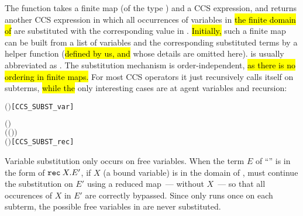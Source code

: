 The function  takes a finite
map  (of the type ) and a CCS expression,
and returns another CCS expression in which
all occurrences of variables in \hl{the finite domain of}  are substituted with
the corresponding value in . \hl{Initially,} such a finite map can be built from
a list of variables  and the corresponding substituted terms
 by a helper function  (\hl{defined by us, and} whose details are
omitted here).
 is usually
abbreviated as .
The substitution mechanism is order-independent, \hl{as there is no
ordering in finite maps.} For most CCS operators it
just recursively calls itself on subterms, \hl{while the} only
interesting cases are at agent variables and recursion:
\begin{alltt}
     \ensuremath{(} \ensuremath{)} \HOLTokenDefEquality{}   \HOLSymConst{\HOLTokenIn{}}         \hfill{[CCS_SUBST_var]}

     \ensuremath{(}  \ensuremath{)} \HOLTokenDefEquality{}
       \HOLSymConst{\HOLTokenIn{}}      \ensuremath{(} \ensuremath{(} \HOLSymConst{\ensuremath{\setminus}} \ensuremath{)} \ensuremath{)}
        \ensuremath{(}  \ensuremath{)}\hfill{[CCS_SUBST_rec]}
\end{alltt}
Variable substitution only occurs on free
variables. When the term $E$ of ``''
is in the form of ${\tt rec}\: X . E'$, if $X$ (a bound variable) is in
the domain of ,  must continue the
substitution on $E'$ using a reduced map~--- without $X$~--- so that all
occurences of $X$ in $E'$ are correctly bypassed.
Since  only runs
once on each subterm, the possible free variables in   are never
 substituted.

